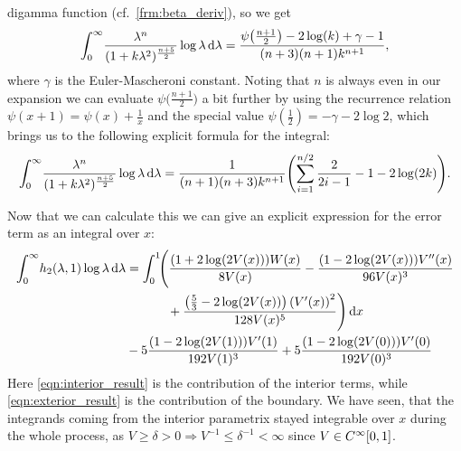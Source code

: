 digamma function (cf.\ \cref{frm:beta_deriv}), so we get
\begin{equation*}
  \Integ[\infty]{0}{\lambda}{
    \frac{\lambda^n}{(1 + k\lambda^2)^{\frac{n+5}{2}}}\log\lambda
  } =
      \frac{
        \psi\bigl(\frac{n+1}{2}\bigr) - 2\log(k) + \gamma - 1
      }{
           (n+3)(n+1)k^{n+1}
      },
\end{equation*}
where $\gamma$ is the Euler-Mascheroni constant. Noting that $n$ is always even
in our expansion we can evaluate $\psi\bigl(\tfrac{n+1}{2}\bigr)$ a bit further
by using the recurrence relation $\psi(x + 1) = \psi(x) + \tfrac{1}{x}$ and the
special value $\psi(\tfrac{1}{2}) = -\gamma - 2\log 2$, which brings us to the
following explicit formula for the integral:
\begin{equation}
  \Integ[\infty]{0}{\lambda}{
    \frac{\lambda^n}{(1 + k \lambda^2)^{\frac{n+5}{2}}}
    \log\lambda
  } = \frac{1}{(n+1)(n+3)k^{n+1}}
  \Biggl( \sum_{i=1}^{n/2}\frac{2}{2i - 1} -1 - 2\log(2k) \Biggr).
\end{equation}

Now that we can calculate this we can give an explicit expression for the error
term as an integral over $x$:
\begin{align}
  \Integ[\infty]{0}{\lambda}{ h_2(\lambda, 1) \log\lambda }
  &=
  \label{eqn:interior_result}
  \Int{x}{\Biggl(\frac{(1 + 2 \log(2 V(x))) W(x)}{8 V(x)}
    - \frac{ (1 - 2 \log(2 V(x)))V''(x)}{96 V(x)^{3}} \\
    &\hphantom{=\int_0^1\Biggl(}\mathbin{+} \frac{\left(\frac{5}{3} - 2\log(2
    V(x))\right)\left(V'(x)\right)^{2}}{128 V(x)^{5}}\Biggr) } \nonumber \\
&\mathbin- 5\frac{(1 - 2\log(2 V(1)))V'(1)}{192 V(1)^3}
+ 5\frac{(1 - 2 \log(2 V(0)))V'(0)}{192 V(0)^3}
\label{eqn:exterior_result}
\end{align}
Here \eqref{eqn:interior_result} is the contribution of the interior terms,
while \eqref{eqn:exterior_result} is the contribution of the boundary. We have
seen, that the integrands coming from the interior parametrix stayed integrable
over $x$ during the whole process, as $V \geq \delta > 0 \Rightarrow V^{-1} \leq
\delta^{-1} < \infty$ since $V\in\Cinf{[0,1]}$.
